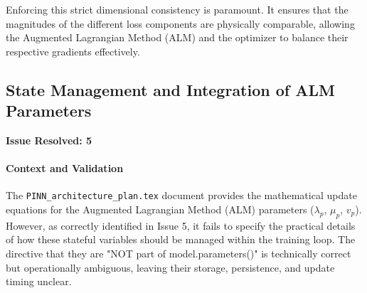 \documentclass[11pt, a4paper]{article}
\begin{document}
Enforcing this strict dimensional consistency is paramount. It ensures that the magnitudes of the different loss components are physically comparable, allowing the Augmented Lagrangian Method (ALM) and the optimizer to balance their respective gradients effectively.

\subsection{State Management and Integration of ALM Parameters}
\textbf{Issue Resolved: 5}
\paragraph{Context and Validation}
The \texttt{PINN\_architecture\_plan.tex} document provides the mathematical update equations for the Augmented Lagrangian Method (ALM) parameters ($\lambda_p$, $\mu_p$, $v_p$). However, as correctly identified in Issue 5, it fails to specify the practical details of how these stateful variables should be managed within the training loop. The directive that they are "NOT part of model.parameters()" is technically correct but operationally ambiguous, leaving their storage, persistence, and update timing unclear.
\end{document}
